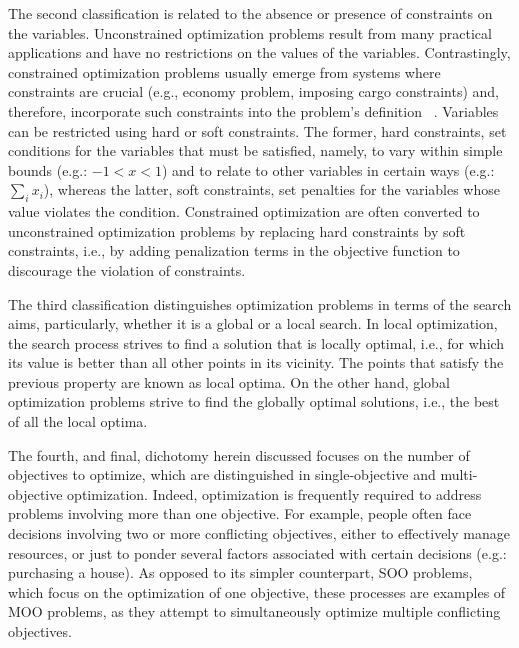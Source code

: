 	The second classification is related to the absence or presence of constraints on the variables. Unconstrained optimization problems result from many practical applications and have no restrictions on the values of the variables. Contrastingly, constrained optimization problems usually emerge from systems where constraints are crucial (e.g., economy problem, imposing cargo constraints) and, therefore, incorporate such constraints into the problem's definition ~\cite{Nocedal2011NumericalOptimization}. Variables can be restricted using hard or soft constraints. The former, hard constraints, set conditions for the variables that must be satisfied, namely, to vary within simple bounds (e.g.: $-1<x<1$) and to relate to other variables in certain ways (e.g.: $\sum_{i} x_i$), whereas the latter, soft constraints, set penalties for the variables whose value violates the condition. Constrained optimization are often converted to unconstrained optimization problems by replacing hard constraints by soft constraints, i.e., by adding penalization terms in the objective function to discourage the violation of constraints. 
	
	The third classification distinguishes optimization problems in terms of the search aims, particularly, whether it is a global or a local search. In local optimization, the search process strives to find a solution that is locally optimal, i.e., for which its value is better than all other points in its vicinity. The points that satisfy the previous property are known as local optima. On the other hand, global optimization problems strive to find the globally optimal solutions, i.e., the best of all the local optima.
	
	The fourth, and final, dichotomy herein discussed focuses on the number of objectives to optimize, which are distinguished in single-objective and multi-objective optimization. Indeed, optimization is frequently required to address problems involving more than one objective. For example, people often face decisions involving two or more conflicting objectives, either to effectively manage resources, or just to ponder several factors associated with certain decisions (e.g.: purchasing a house). As opposed to its simpler counterpart, \ac{SOO} problems, which focus on the optimization of one objective, these processes are examples of \ac{MOO} problems, as they attempt to simultaneously optimize multiple conflicting objectives. %
		
